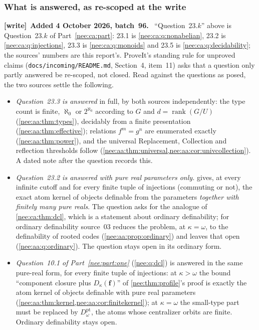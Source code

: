 \documentclass[11pt,letterpaper]{article}
\numberwithin{equation}{section}
\theoremstyle{plain}
\theoremstyle{definition}
\theoremstyle{remark}
\newcommand{\rank}{\operatorname{rank}}
\newenvironment{writenote}[1][]{\par\smallskip\begingroup\small\raggedright
 \setlength{\parindent}{1.25em}\noindent\textbf{[write]}\if\relax\detokenize{#1}\relax\else~\textbf{#1.}\fi\ }%
 {\par\endgroup\smallskip}
\begin{document}
\subsubsection*{What is answered, as re-scoped at the write}\label{nee:aa:sec:questions-answered}

\begin{writenote}[Added 4 October 2026, batch~96]
``Question~23.$k$'' above is Question~23.$k$ of Part~\ref{nee:ca:part}: 23.1 is \cref{nee:ca:q:nonabelian}, 23.2 is \cref{nee:ca:q:injections}, 23.3 is \cref{nee:ca:q:monoids} and 23.5 is \cref{nee:ca:q:decidability}; the sources' numbers are this report's. ProveIt's standing rule for unproved claims (\nolinkurl{docs/incoming/README.md}, Section~4, item~11) asks that a question only partly answered be re-scoped, not closed. Read against the questions as posed, the two sources settle the following.
\begin{itemize}
\item \emph{Question~23.3 is answered} in full, by both sources independently: the type count is finite, $\aleph_0$ or $2^{\aleph_0}$ according to $G$ and $d=\rank(G/U)$ (\cref{nee:aa:thm:types}), decidably from a finite presentation (\cref{nee:aa:thm:effective}); relations $f^m=g^n$ are enumerated exactly (\cref{nee:aa:thm:power}), and the universal Replacement, Collection and reflection thresholds follow (\cref{nee:aa:thm:universal,nee:aa:cor:univcollection}). A dated note after the question records this.
\item \emph{Question~23.2 is answered with pure real parameters only.}  gives, at every infinite cutoff and for every finite tuple of injections (commuting or not), the exact atom kernel of objects definable from the parameters \emph{together with finitely many pure reals}. The question asks for the analogue of \cref{nee:ca:thm:dcl}, which is a statement about ordinary definability; for ordinary definability source~03 reduces the problem, at $\kappa=\omega$, to the definability of rooted codes (\cref{nee:aa:prop:ordinary}) and leaves that open (\cref{nee:aa:q:ordinary}). The question stays open in its ordinary form.
\item \emph{Question~10.1 of Part~\ref{nee:part:one}} (\cref{nee:q:dcl}) is answered in the same pure-real form, for every finite tuple of injections: at $\kappa>\omega$ the bound ``component closure plus $D_\kappa(\boldsymbol f)$'' of \cref{nee:thm:profile}'s proof is exactly the atom kernel of objects definable with pure real parameters (\cref{nee:aa:thm:kernel,nee:aa:cor:finitekernel}); at $\kappa=\omega$ the small-type part must be replaced by $D^{\mathrm{pt}}_\omega$, the atoms whose centralizer orbits are finite. Ordinary definability stays open.

\end{itemize}
\end{writenote}
\end{document}
